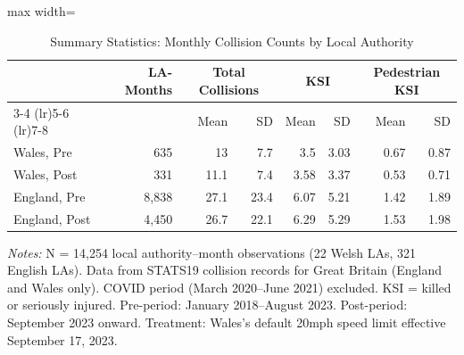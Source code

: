 \begin{table}[H]
\centering
\caption{Summary Statistics: Monthly Collision Counts by Local Authority}
\label{tab:summary}
\begin{threeparttable}
\begin{adjustbox}{max width=\textwidth}
\begin{tabular}{lrrrrrrr}
\toprule
 & LA-Months & \multicolumn{2}{c}{Total Collisions} & \multicolumn{2}{c}{KSI} & \multicolumn{2}{c}{Pedestrian KSI} \\
\cmidrule(lr){3-4} \cmidrule(lr){5-6} \cmidrule(lr){7-8}
 & & Mean & SD & Mean & SD & Mean & SD \\
\midrule
Wales, Pre & 635 & 13 & 7.7 & 3.5 & 3.03 & 0.67 & 0.87 \\
Wales, Post & 331 & 11.1 & 7.4 & 3.58 & 3.37 & 0.53 & 0.71 \\
\midrule
England, Pre & 8,838 & 27.1 & 23.4 & 6.07 & 5.21 & 1.42 & 1.89 \\
England, Post & 4,450 & 26.7 & 22.1 & 6.29 & 5.29 & 1.53 & 1.98 \\
\bottomrule
\end{tabular}
\end{adjustbox}
\begin{tablenotes}[flushleft]
\small
\item \textit{Notes:} N = 14,254 local authority--month observations (22 Welsh LAs, 321 English LAs). Data from STATS19 collision records for Great Britain (England and Wales only). COVID period (March 2020--June 2021) excluded. KSI = killed or seriously injured. Pre-period: January 2018--August 2023. Post-period: September 2023 onward. Treatment: Wales's default 20mph speed limit effective September 17, 2023.
\end{tablenotes}
\end{threeparttable}
\end{table}
